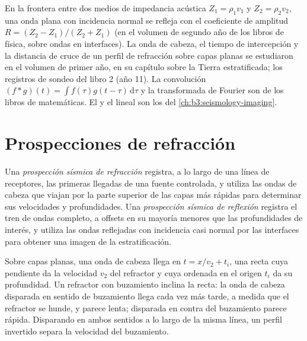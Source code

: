 \begin{recall}
En la frontera entre dos medios de impedancia acústica $Z_1 = \rho_1v_1$ y
$Z_2 = \rho_2v_2$, una onda plana con incidencia normal se refleja con el
coeficiente de amplitud $R = (Z_2 - Z_1)/(Z_2 + Z_1)$ (en el volumen de segundo año de
los libros de física, sobre ondas en interfaces). La onda de cabeza, el tiempo de intercepción y la
distancia de cruce de un perfil de refracción sobre capas planas se estudiaron en el
volumen de primer año, en su capítulo sobre la Tierra estratificada; los registros de sondeo del
libro 2 (año 11). La convolución $(f*g)(t) = \int f(\tau)g(t - \tau)\,\mathrm d\tau$
y la transformada de Fourier son de los libros de matemáticas. El  y el
 lineal son los del \cref{ch:b3:seismology-imaging}.
\end{recall}

\section{Prospecciones de refracción}

\begin{definition}\label{def:b3:exploration-seismology:surveys}
Una \emph{prospección sísmica de refracción} registra, a lo largo
de una línea de receptores, las primeras llegadas de una fuente controlada, y utiliza las
ondas de cabeza que viajan por la parte superior de las capas más rápidas para determinar sus velocidades y
profundidades. Una \emph{prospección sísmica de reflexión}
registra el tren de ondas completo, a offsets en su mayoría menores que las profundidades de
interés, y utiliza las ondas reflejadas con incidencia casi normal por las
interfaces para obtener una imagen de la estratificación.
\end{definition}

Sobre capas planas, una onda de cabeza llega en $t = x/v_2 + t_i$, una recta
cuya pendiente da la velocidad $v_2$ del refractor y cuya ordenada en el origen $t_i$
da su profundidad. Un refractor con buzamiento inclina la recta: la onda de cabeza disparada
en sentido de buzamiento llega cada vez más tarde, a medida que el refractor se hunde, y parece lenta;
disparada en contra del buzamiento parece rápida. Disparando en ambos sentidos a lo largo de la misma línea, un perfil invertido
separa la velocidad del buzamiento.


